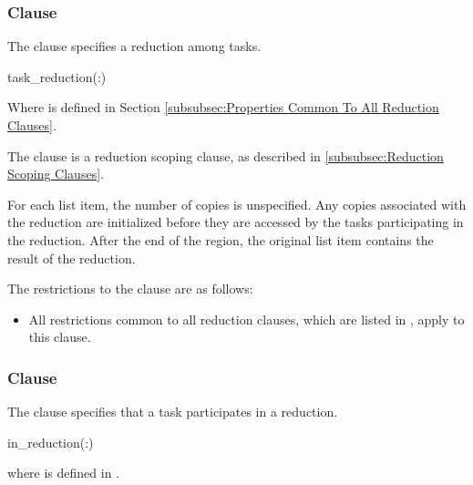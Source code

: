 \subsubsection{ Clause}
\label{subsubsec:task_reduction clause}
\summary
The  clause specifies a reduction among tasks.

\syntax
\begin{ompSyntax}
task_reduction(:)
\end{ompSyntax}
Where  is defined in Section
\ref{subsubsec:Properties Common To All Reduction Clauses}.

\descr
The  clause is a reduction scoping clause, as described in
\ref{subsubsec:Reduction Scoping Clauses}.

For each list item, the number of copies is unspecified. Any copies associated
with the reduction are initialized before they are accessed by the tasks
participating in the reduction. After the end of the region, the original list
item contains the result of the reduction.

\restrictions
The restrictions to the  clause are as follows:

\begin{itemize}
\item All restrictions common to all reduction clauses, which are listed in
      , apply to
      this clause.
\end{itemize}



\subsubsection{ Clause}
\label{subsubsec:in_reduction clause}
\summary
The  clause specifies that a task participates in a reduction.

\syntax
\begin{ompSyntax}
in_reduction(:)
\end{ompSyntax}

where  is defined in 
.

